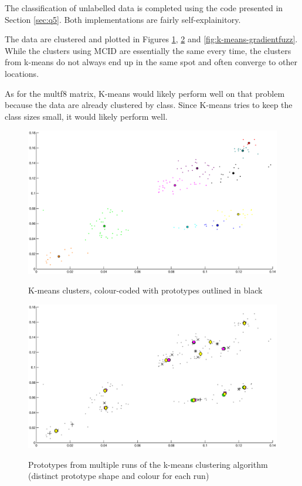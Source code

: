 \label{sec:unlabelled}

The classification of unlabelled data is completed using the code presented in
Section \ref{sec:q5}. Both implementations are fairly self-explainitory.

The data are clustered and plotted in Figures \ref{fig:k-means-clear},
\ref{fig:k-means-multifuzz} and \ref{fig:k-means-gradientfuzz}. While the
clusters using MCID are essentially the same every time, the clusters from
k-means do not always end up in the same spot and often converge to other
locations. 

As for the multf8 matrix, K-means would likely perform well on that problem
because the data are already clustered by class. Since K-means tries to keep
the class sizes small, it would likely perform well.

\begin{figure}
\includegraphics[width=\textwidth]{images/clear-coloured}
\label{fig:k-means-clear}
\caption{K-means clusters, colour-coded with prototypes outlined in black}
\end{figure}

\begin{figure}
\includegraphics[width=\textwidth]{images/fuzzy-multiple}
\label{fig:k-means-multifuzz}
\caption{Prototypes from multiple runs of the k-means clustering algorithm
(distinct prototype shape and colour for each run)}
\end{figure}

